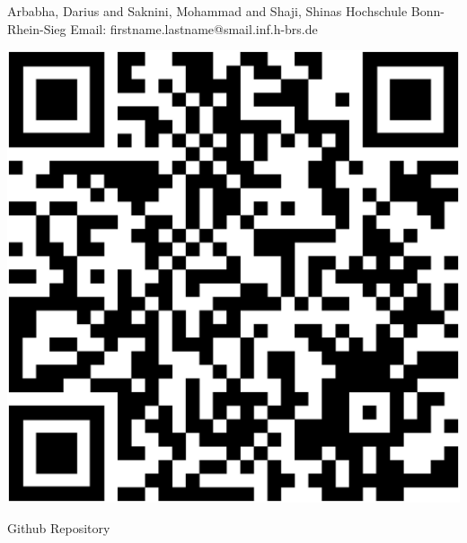

{
	\vspace*{1cm}
    \begin{minipage}{0.75\linewidth}
        \vspace*{-2.5cm}
        Arbabha, Darius and Saknini, Mohammad and Shaji, Shinas\newline
        Hochschule Bonn-Rhein-Sieg\newline
        Email: firstname.lastname@smail.inf.h-brs.de\newline
    \end{minipage}
    \begin{minipage}{0.24\linewidth}
        \centering
        \vspace{-1.5cm}
        \begin{tikzfigure}
            \includegraphics[scale=0.125]{figures/qrcode.eps}
        \end{tikzfigure}
        Github Repository
    \end{minipage}
    \vspace*{-3cm}
    
}

